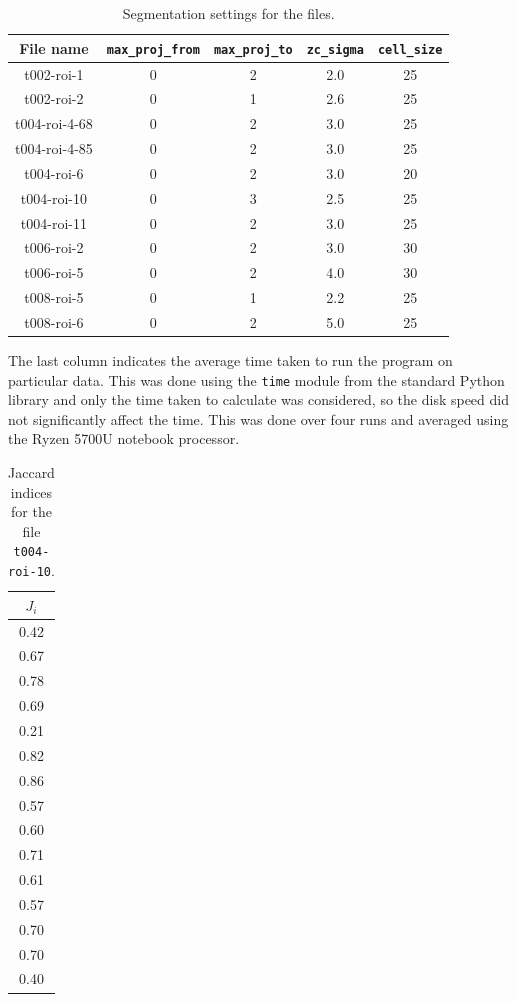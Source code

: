 \documentclass[
  digital,     %
  oneside,     %
  nosansbold,  %
  nocolorbold, %
  lof,         %
  lot,         %
]{fithesis4}
\begin{document}
\begin{table}
    \hspace*{-0.5cm}\begin{tabular}{|| c|c|c|c|c ||}
        \toprule
        File name & \texttt{max\_proj\_from} & \texttt{max\_proj\_to}& \texttt{zc\_sigma} & \texttt{cell\_size}\\
        \midrule
        t002-roi-1   &0&2&2.0&25\\
        t002-roi-2   &0&1&2.6&25\\
        t004-roi-4-68&0&2&3.0&25\\
        t004-roi-4-85&0&2&3.0&25\\
        t004-roi-6   &0&2&3.0&20\\
        t004-roi-10  &0&3&2.5&25\\
        t004-roi-11  &0&2&3.0&25\\
        t006-roi-2   &0&2&3.0&30\\
        t006-roi-5   &0&2&4.0&30\\
        t008-roi-5   &0&1&2.2&25\\
        t008-roi-6   &0&2&5.0&25\\
        \bottomrule
    \end{tabular}
    \caption{Segmentation settings for the files.}
    \label{table:configurations}
\end{table}

The last column indicates the average time taken to run the program on
particular data. This was done using the \texttt{time} module from the standard
Python library and only the time taken to calculate was considered,
so the disk speed did not significantly affect the time. This was done over
four runs and averaged using the Ryzen 5700U notebook processor.

\begin{table}
    \begin{tabular}{||c||}
        \toprule
        $J_i$\\
        \midrule
        0.42\\
        0.67\\
        0.78\\
        0.69\\
        0.21\\
        0.82\\
        0.86\\
        0.57\\
        0.60\\
        0.71\\
        0.61\\
        0.57\\
        0.70\\
        0.70\\
        0.40\\
        \bottomrule
    \end{tabular}
    \caption{Jaccard indices for the file \texttt{t004-roi-10}.}
    \label{tab:scores_roi10}
\end{table}
\end{document}
